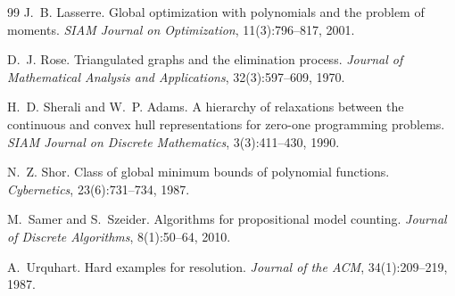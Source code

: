 \documentclass[11pt]{article}
\begin{document}
\begin{thebibliography}{99}
J.~B. Lasserre.
Global optimization with polynomials and the problem of moments.
\emph{SIAM Journal on Optimization}, 11(3):796--817, 2001.

D.~J. Rose.
Triangulated graphs and the elimination process.
\emph{Journal of Mathematical Analysis and Applications}, 32(3):597--609, 1970.

H.~D. Sherali and W.~P. Adams.
A hierarchy of relaxations between the continuous and convex hull representations for zero-one programming problems.
\emph{SIAM Journal on Discrete Mathematics}, 3(3):411--430, 1990.

N.~Z. Shor.
Class of global minimum bounds of polynomial functions.
\emph{Cybernetics}, 23(6):731--734, 1987.

M.~Samer and S.~Szeider.
Algorithms for propositional model counting.
\emph{Journal of Discrete Algorithms}, 8(1):50--64, 2010.

A.~Urquhart.
Hard examples for resolution.
\emph{Journal of the ACM}, 34(1):209--219, 1987.

\end{thebibliography}
\end{document}
